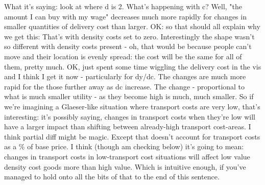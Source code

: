 What it's saying: look at where d is 2. What's happening with c? Well, "the amount I can buy with my wage" decreases much more rapidly for changes in smaller quantities of delivery cost than larger. 
OK: so that should all explain why we get this:
That's with density costs set to zero. Interestingly the shape wasn't so different with density costs present - oh, that would be because people can't move and their location is evenly spread: the cost will be the same for all of them, pretty much.
OK, just spent some time wiggling the delivery cost in the vis and I think I get it now - particularly for dy/dc. The changes are much more rapid for the those further away as dc increase. The change - proportional to what is much smaller utility - as they become high is much, much smaller.
So if we're imagining a Glaeser-like situation where transport costs are very low, that's interesting: it's possibly saying, changes in transport costs when they're low will have a larger impact than shifting between already-high transport cost-areas. 
I think partial diff might be magic. 
Except that doesn't account for transport costs as a \% of base price. I think (though am checking below) it's going to mean: changes in transport costs in low-transport cost situations will affect low value density cost goods more than high value. Which is intuitive enough, if you've managed to hold onto all the bits of that to the end of this sentence.
